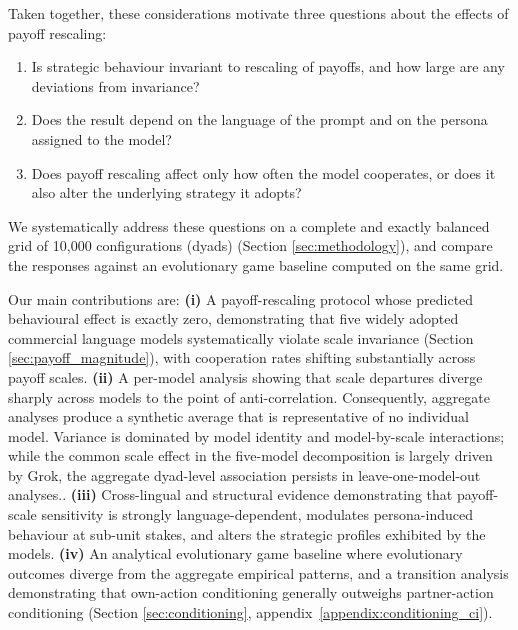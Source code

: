 \documentclass[11pt,a4paper]{article}
\begin{document}
Taken together, these considerations motivate three questions about the effects of payoff rescaling:
\begin{enumerate}[(1)]
\item Is strategic behaviour invariant to   rescaling of payoffs, and how large are any deviations from invariance?
\item Does the result depend on the language of the prompt and on the persona assigned to the model?

\item Does payoff rescaling affect only how often the model  cooperates, or does it also alter the underlying strategy it adopts?

\end{enumerate}
We systematically address these questions on a complete and exactly balanced grid of 10{,}000 configurations (dyads)
(Section \ref{sec:methodology}), and compare the responses against an evolutionary game
baseline computed on the same grid.

Our main contributions  are: \textbf{(i)} A payoff-rescaling protocol whose predicted behavioural
effect is exactly zero, demonstrating that five widely adopted commercial language models systematically violate scale invariance (Section \ref{sec:payoff_magnitude}), with
cooperation rates shifting substantially across payoff scales. \textbf{(ii)} A
per-model analysis showing that scale departures diverge sharply across
models to the point of anti-correlation. Consequently, aggregate analyses produce a synthetic average that is representative of no individual model. Variance is dominated by model identity and model-by-scale interactions; while the common scale effect in the five-model decomposition is largely driven by Grok, the aggregate dyad-level association persists in leave-one-model-out analyses.. \textbf{(iii)} Cross-lingual and structural evidence demonstrating that payoff-scale sensitivity is strongly language-dependent, modulates persona-induced behaviour at sub-unit stakes, and alters the strategic profiles exhibited by the models.
\textbf{(iv)} An analytical evolutionary game baseline where evolutionary outcomes diverge from the aggregate empirical patterns, and a transition analysis demonstrating  that own-action  conditioning generally outweighs partner-action conditioning (Section \ref{sec:conditioning}, appendix~\ref{appendix:conditioning_ci}).
\end{document}
